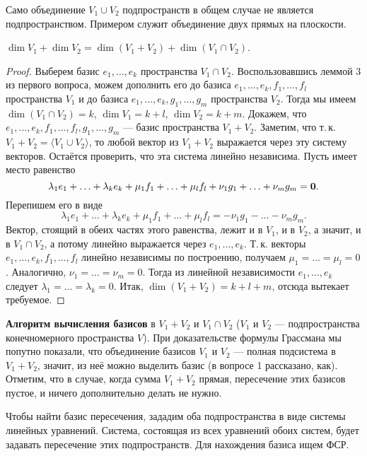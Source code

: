 \begin{remark}
    Само объединение $V_1 \cup V_2$ подпространств в общем случае не является подпространством. Примером служит объединение двух прямых на плоскости.
\end{remark}

\begin{theorem}
    $\dim V_1 + \dim V_2 = \dim(V_1 + V_2) + \dim(V_1 \cap V_2)$.
\end{theorem}

\begin{proof}
    Выберем базис $e_1, \ldots, e_k$ пространства $V_1 \cap V_2$. Воспользовавшись леммой 3 из первого вопроса, можем дополнить его до базиса $e_1, \ldots, e_k, f_1, \ldots, f_l$ пространства $V_1$ и до базиса $e_1, \ldots, e_k, g_1, \ldots, g_m$ пространства $V_2$. Тогда мы имеем $\dim(V_1 \cap V_2) = k$, $\dim V_1 = k + l$, $\dim V_2 = k + m$. Докажем, что $e_1, \ldots, e_k, f_1, \ldots, f_l, g_1, \ldots, g_m$ --- базис пространства $V_1 + V_2$. Заметим, что т.\,к. $V_1 + V_2 = \langle V_1 \cup V_2\rangle$, то любой вектор из $V_1 + V_2$ выражается через эту систему векторов. Остаётся проверить, что эта система линейно независима. Пусть имеет место равенство
    \[
        \lambda_1e_1 + \ldots + \lambda_ke_k + \mu_1f_1 + \ldots + \mu_lf_l + \nu_1g_1 + \ldots + \nu_mg_m = \boldsymbol{0}.
    \]
    Перепишем его в виде
    \[
        \lambda_1e_1 + \ldots + \lambda_ke_k + \mu_1f_1 + \ldots + \mu_lf_l = -\nu_1g_1 - \ldots - \nu_mg_m.
    \]
    Вектор, стоящий в обеих частях этого равенства, лежит и в $V_1$, и в $V_2$, а значит, и в $V_1 \cap V_2$, а потому линейно выражается через $e_1, \ldots, e_k$. Т.\,к. векторы $e_1, \ldots, e_k, f_1, \ldots, f_l$ линейно независимы по построению, получаем $\mu_1 = \ldots = \mu_l = 0$. Аналогично, $\nu_1 = \ldots = \nu_m = 0$. Тогда из линейной независимости $e_1, \ldots, e_k$ следует $\lambda_1 = \ldots = \lambda_k = 0$. Итак, $\dim(V_1 + V_2) = k + l + m$, отсюда вытекает требуемое.
\end{proof}

\textbf{Алгоритм вычисления базисов} в $V_1 + V_2$ и $V_1 \cap V_2$ ($V_1$ и $V_2$ --- подпространства конечномерного пространства $V$). При доказательстве формулы Грассмана мы попутно показали, что объединение базисов $V_1$ и $V_2$ --- полная подсистема в $V_1 + V_2$, значит, из неё можно выделить базис (в вопросе 1 рассказано, как). Отметим, что в случае, когда сумма $V_1 + V_2$ прямая, пересечение этих базисов пустое, и ничего дополнительно делать не нужно.

Чтобы найти базис пересечения, зададим оба подпространства в виде системы линейных уравнений. Система, состоящая из всех уравнений обоих систем, будет задавать пересечение этих подпространств. Для нахождения базиса ищем ФСР.

